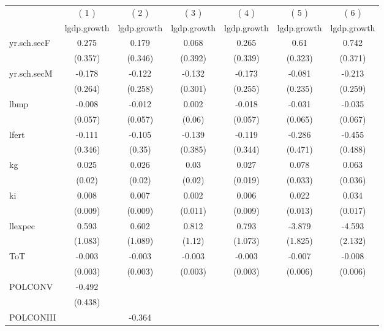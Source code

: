 \documentclass{article}\usepackage{graphicx, color}
\begin{document}
\begin{table}
\centering
\small
\begin{tabular}{l*{6}{c}}
\hline\hline
	 &\multicolumn{1}{c}{( 1 )}  	 &\multicolumn{1}{c}{( 2 )}  	 &\multicolumn{1}{c}{( 3 )}  	 &\multicolumn{1}{c}{( 4 )}  	 &\multicolumn{1}{c}{( 5 )}  	 &\multicolumn{1}{c}{( 6 )}  \\  &\multicolumn{1}{c}{lgdp.growth} &\multicolumn{1}{c}{lgdp.growth} &\multicolumn{1}{c}{lgdp.growth} &\multicolumn{1}{c}{lgdp.growth} &\multicolumn{1}{c}{lgdp.growth} &\multicolumn{1}{c}{lgdp.growth} \\
\hline
yr.sch.secF 		&0.275 		&0.179 		&0.068 		&0.265 		&0.61\sym{*} 		&0.742\sym{*} \\
  		&(0.357) 		&(0.346) 		&(0.392) 		&(0.339) 		&(0.323) 		&(0.371) \\
yr.sch.secM 		&-0.178 		&-0.122 		&-0.132 		&-0.173 		&-0.081 		&-0.213 \\
  		&(0.264) 		&(0.258) 		&(0.301) 		&(0.255) 		&(0.235) 		&(0.259) \\
lbmp 		&-0.008 		&-0.012 		&0.002 		&-0.018 		&-0.031 		&-0.035 \\
  		&(0.057) 		&(0.057) 		&(0.06) 		&(0.057) 		&(0.065) 		&(0.067) \\
lfert 		&-0.111 		&-0.105 		&-0.139 		&-0.119 		&-0.286 		&-0.455 \\
  		&(0.346) 		&(0.35) 		&(0.385) 		&(0.344) 		&(0.471) 		&(0.488) \\
kg 		&0.025 		&0.026 		&0.03 		&0.027 		&0.078\sym{**} 		&0.063\sym{*} \\
  		&(0.02) 		&(0.02) 		&(0.02) 		&(0.019) 		&(0.033) 		&(0.036) \\
ki 		&0.008 		&0.007 		&0.002 		&0.006 		&0.022\sym{*} 		&0.034\sym{*} \\
  		&(0.009) 		&(0.009) 		&(0.011) 		&(0.009) 		&(0.013) 		&(0.017) \\
llexpec 		&0.593 		&0.602 		&0.812 		&0.793 		&-3.879\sym{**} 		&-4.593\sym{**} \\
  		&(1.083) 		&(1.089) 		&(1.12) 		&(1.073) 		&(1.825) 		&(2.132) \\
ToT 		&-0.003 		&-0.003 		&-0.003 		&-0.003 		&-0.007 		&-0.008 \\
  		&(0.003) 		&(0.003) 		&(0.003) 		&(0.003) 		&(0.006) 		&(0.006) \\
POLCONV 		&-0.492 		& 		& 		& 		& 		& \\
  		&(0.438) 		& 		& 		& 		& 		& \\
POLCONIII 		& 		&-0.364 		& 		& 		& 		& \\

\end{tabular}
\end{table}
\end{document}
